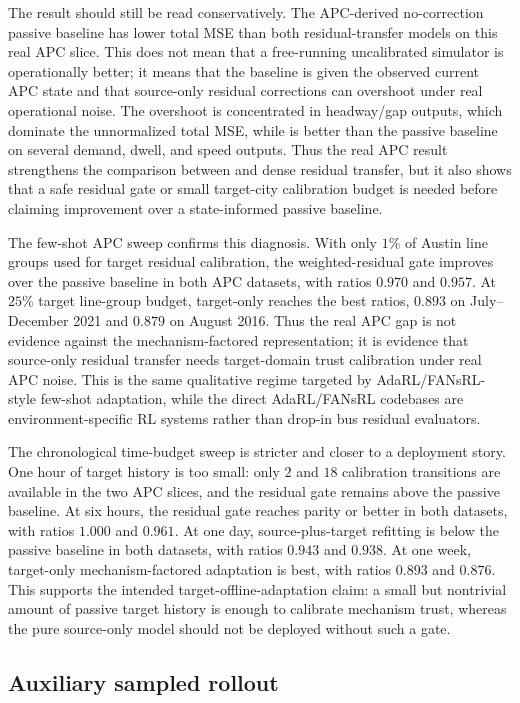 The result should still be read conservatively.
The APC-derived no-correction passive baseline has lower total MSE than both residual-transfer models on this real APC slice.
This does not mean that a free-running uncalibrated simulator is operationally better; it means that the baseline is given the observed current APC state and that source-only residual corrections can overshoot under real operational noise.
The overshoot is concentrated in headway/gap outputs, which dominate the unnormalized total MSE, while \ours is better than the passive baseline on several demand, dwell, and speed outputs.
Thus the real APC result strengthens the comparison between \ours and dense residual transfer, but it also shows that a safe residual gate or small target-city calibration budget is needed before claiming improvement over a state-informed passive baseline.

The few-shot APC sweep confirms this diagnosis.
With only $1\%$ of Austin line groups used for target residual calibration, the weighted-\ours residual gate improves over the passive baseline in both APC datasets, with ratios $0.970$ and $0.957$.
At $25\%$ target line-group budget, target-only \ours reaches the best ratios, $0.893$ on July--December 2021 and $0.879$ on August 2016.
Thus the real APC gap is not evidence against the mechanism-factored representation; it is evidence that source-only residual transfer needs target-domain trust calibration under real APC noise.
This is the same qualitative regime targeted by AdaRL/FANsRL-style few-shot adaptation, while the direct AdaRL/FANsRL codebases are environment-specific RL systems rather than drop-in bus residual evaluators.

The chronological time-budget sweep is stricter and closer to a deployment story.
One hour of target history is too small: only $2$ and $18$ calibration transitions are available in the two APC slices, and the residual gate remains above the passive baseline.
At six hours, the residual gate reaches parity or better in both datasets, with ratios $1.000$ and $0.961$.
At one day, source-plus-target refitting is below the passive baseline in both datasets, with ratios $0.943$ and $0.938$.
At one week, target-only mechanism-factored adaptation is best, with ratios $0.893$ and $0.876$.
This supports the intended target-offline-adaptation claim: a small but nontrivial amount of passive target history is enough to calibrate mechanism trust, whereas the pure source-only model should not be deployed without such a gate.

\subsection{Auxiliary sampled rollout}

